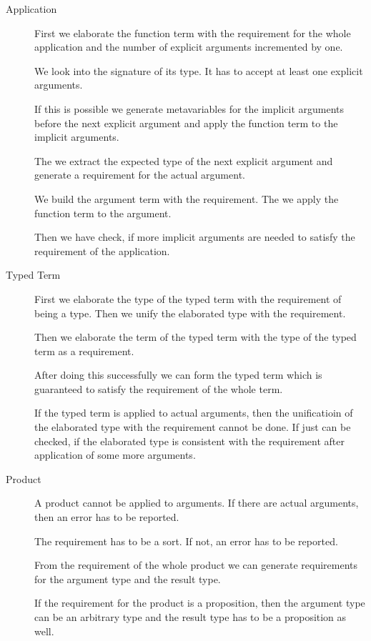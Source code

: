 \begin{description}
\item[Application] First we elaborate the function term with the requirement for
    the whole application and the number of explicit arguments incremented by
        one.

        We look into the signature of its type. It has to accept at least one
        explicit arguments.

        If this is possible we generate metavariables for the implicit arguments
        before the next explicit argument and apply the function term to the
        implicit arguments.

        The we extract the expected type of the next explicit argument and
        generate a requirement for the actual argument.

        We build the argument term with the requirement. The we apply the
        function term to the argument.

        Then we have check, if more implicit arguments are needed to satisfy the
        requirement of the application.

\item [Typed Term] First we elaborate the type of the typed term with the
    requirement of being a type. Then we unify the elaborated type with the
    requirement.

    Then we elaborate the term of the typed term with the type of the typed
    term as a requirement.

    After doing this successfully we can form the typed term which is guaranteed
    to satisfy the requirement of the whole term.

    If the typed term is applied to actual arguments, then the unificatioin of
    the elaborated type with the requirement cannot be done. If just can be
    checked, if the elaborated type is consistent with the requirement after
    application of some more arguments.


\item [Product] A product cannot be applied to arguments. If there are actual
    arguments, then an error has to be reported.

    The requirement has to be a sort. If not, an error has to be reported.

    From the requirement of the whole product we can generate requirements for
    the argument type and the result type.

    If the requirement for the product is a proposition, then the argument type
    can be an arbitrary type and the result type has to be a proposition as
    well.


\end{description}
